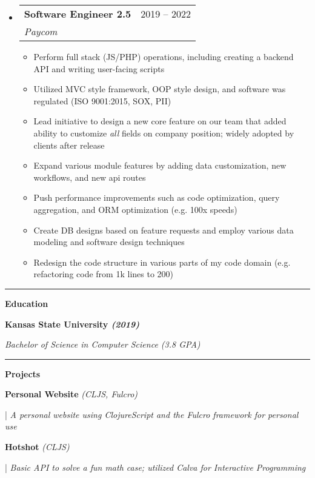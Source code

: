 \documentclass[letterpaper,11pt]{article}
\makeatletter
\newcommand{\resumeItem}[1]{
  \item\small{
    {#1 \vspace{-2pt}}
  }
}
\newcommand{\resumeSubheading}[4]{
  \vspace{-2pt}\item
    \begin{tabular*}{0.97\textwidth}[t]{l@{\extracolsep{\fill}}r}
      \textbf{#1} & #2 \\
      \textit{\small#3} & \textit{\small #4} \\
    \end{tabular*}\vspace{0pt}
}
\newcommand{\resumeSubHeadingListStart}{\begin{itemize}[leftmargin=0.15cm, label={}]}
\newcommand{\resumeSubHeadingListEnd}{\end{itemize}}
\newcommand{\resumeItemListStart}{\begin{itemize}}
\newcommand{\resumeItemListEnd}{\end{itemize}\vspace{-5pt}}
\makeatother
\begin{document}
\resumeSubHeadingListStart
\resumeSubheading
{Software Engineer 2.5}{2019 – 2022}
{Paycom}{}
\resumeItemListStart
\resumeItem{Perform full stack (JS/PHP) operations, including creating a backend API and writing user-facing scripts}
\resumeItem{Utilized MVC style framework, OOP style design, and software was regulated (ISO 9001:2015, SOX, PII)}
\resumeItem{Lead initiative to design a new core feature on our team that added ability to customize \textit{all} fields on company position; widely adopted by clients after release }
\resumeItem{Expand various module features by adding data customization, new workflows, and new api routes}
\resumeItem{Push performance improvements such as code optimization, query aggregation, and ORM optimization (e.g. 100x speeds)}
\resumeItem{Create DB designs based on feature requests and employ various data modeling and software design techniques}
\resumeItem{Redesign the code structure in various parts of my code domain (e.g. refactoring code from 1k lines to 200)}
\resumeItemListEnd
\resumeSubHeadingListEnd
\noindent\rule{19.5cm}{0.4pt}

\textbf{\large \textcolor{magic_blue}{Education}}

\begin{minipage}[t]{0.45\textwidth}
    \raggedright
    \textbf{ Kansas State University \textit{(2019)}} \\
\end{minipage}
\hfill
\begin{minipage}[t]{0.45\textwidth}
    \raggedleft
    \textit{Bachelor of Science in Computer Science (3.8 GPA)} \\
\end{minipage}
\noindent\rule{19.5cm}{0.4pt}

\textbf{\large \textcolor{magic_blue}{Projects}}

\begin{minipage}[t]{0.28\textwidth}
    \raggedright
    \textbf{ Personal Website }\textit{(CLJS, Fulcro)} \\
\end{minipage}
\hfill
\begin{minipage}[t]{0.70\textwidth}
    \raggedright
    |\textit{ A personal website using ClojureScript and the Fulcro framework for personal use} \\
\end{minipage}

\begin{minipage}[t]{0.28\textwidth}
    \raggedright
    \textbf{ Hotshot }\textit{(CLJS)}\\
\end{minipage}
\hfill
\begin{minipage}[t]{0.70\textwidth}
    \raggedright
    |\textit{ Basic API to solve a fun math case; utilized Calva for Interactive Programming  } \\
\end{minipage}
\end{document}

